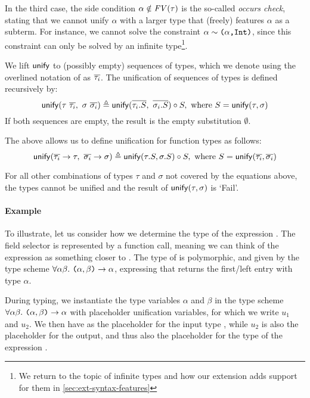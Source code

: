 In the third case, the side condition $\alpha \notin \mathit{FV}(\tau)$ is the so-called
\emph{occurs check}, stating that we cannot unify $\alpha$ with a larger type
that (freely) features $\alpha$ as a subterm.
For instance, we cannot solve the constraint $\alpha \sim \texttt{(}\alpha\texttt{,}\texttt{Int}\texttt{)}$,
since this constraint can only be solved by an infinite type\footnote{%
We return to the topic of infinite types and how our extension adds support for
them in \cref{sec:ext-syntax-features}}.

We lift $\mathsf{unify}$ to (possibly empty) sequences of types, which we denote using
the overlined notation of \citet{Igarashi2001} as $\overline{\tau_i}$. The
unification of sequences of types is defined recursively by:
\[ \unify(\tau\ \set{\tau_i},\ \sigma\ \set{\sigma_i}) \eqdef
    \unify(\set{\tau_i.S},\ \set{\sigma_i.S}) \circ S,
    \text{ where } S = \unify(\tau,\sigma) \]
If both sequences are empty, the result is the empty substitution $\emptyset$.

The above allows us to define unification for function types as follows:
\[ \unify(\set{\tau_i} \to \tau,\ \set{\sigma_i} \to \sigma) \eqdef
    \unify(\tau.S,\sigma.S) \circ S, \text{ where } S = \unify(\set{\tau_i}, \set{\sigma_i}) \]

For all other combinations of types $\tau$ and $\sigma$ not covered by the
equations above, the types cannot be unified and the result of
$\mathsf{unify}(\tau,\sigma)$ is `\textsf{Fail}'.

\paragraph{Example}
To illustrate, let us consider how we determine the type of the
expression . The field selector  is represented by a
function call, meaning we can think of the expression as something
closer to . The type of  is polymorphic, and
given by the type scheme $\forall \alpha \beta.\ \code{(}\alpha,\beta\code{)}
\to \alpha$, expressing that  returns the first/left entry with type
$\alpha$.

During typing, we instantiate the type variables $\alpha$ and $\beta$ in the
type scheme $\forall \alpha \beta.\ \code{(}\alpha,\beta\code{)} \to \alpha$
with placeholder unification variables, for which we write $u_1$ and $u_2$.
We then have  as the placeholder for the input type
, while $u_2$ is also the placeholder for the output, and thus also
the placeholder for the type of the expression .

